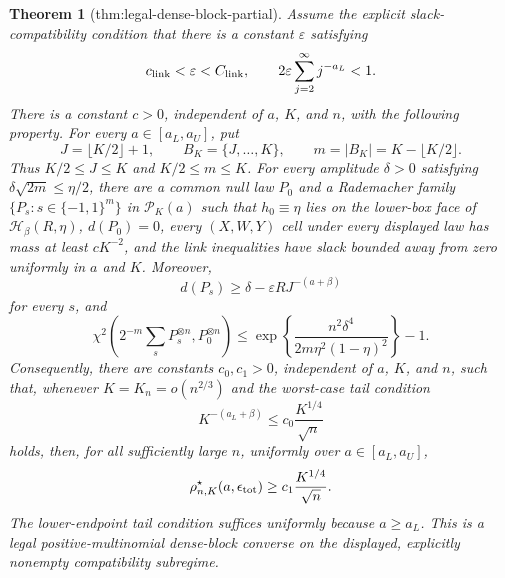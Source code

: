 \documentclass{article}
\newtheorem{theorem}{Theorem}
\begin{document}
\begin{theorem}[thm:legal-dense-block-partial]\label{thm:legal-dense-block-partial}
Assume the explicit slack-compatibility condition that there is a constant \(\varepsilon\) satisfying
\[
 c_{\rm link}<\varepsilon<C_{\rm link},
 \qquad
 2\varepsilon\sum_{j=2}^{\infty}j^{-a_L}<1.
\]
There is a constant \(c>0\), independent of \(a\), \(K\), and \(n\), with the following property.  For every \(a\in[a_L,a_U]\), put
\[
 J=\lfloor K/2\rfloor+1,
 \qquad
 B_K=\{J,\ldots,K\},
 \qquad
 m=|B_K|=K-\lfloor K/2\rfloor.
\]
Thus \(K/2\le J\le K\) and \(K/2\le m\le K\).  For every amplitude \(\delta>0\) satisfying \(\delta\sqrt{2m}\le\eta/2\), there are a common null law \(P_0\) and a Rademacher family \(\{P_s:s\in\{-1,1\}^m\}\) in \(\mathcal P_K(a)\) such that \(h_0\equiv\eta\) lies on the lower-box face of \(\mathcal H_\beta(R,\eta)\), \(d(P_0)=0\), every \((X,W,Y)\) cell under every displayed law has mass at least \(cK^{-2}\), and the link inequalities have slack bounded away from zero uniformly in \(a\) and \(K\).  Moreover,
\[
 d(P_s)\ge \delta-\varepsilon R J^{-(a+\beta)}
\]
for every \(s\), and
\[
 \chi^2\!\left(2^{-m}\sum_sP_s^{\otimes n},P_0^{\otimes n}\right)
 \le \exp\!\left\{\frac{n^2\delta^4}{2m\eta^2(1-\eta)^2}\right\}-1.
\]
Consequently, there are constants \(c_0,c_1>0\), independent of \(a\), \(K\), and \(n\), such that, whenever \(K=K_n=o(n^{2/3})\) and the worst-case tail condition
\[
 K^{-(a_L+\beta)}\le c_0\frac{K^{1/4}}{\sqrt n}
\]
holds, then, for all sufficiently large \(n\), uniformly over \(a\in[a_L,a_U]\),
\[
 \rho^\star_{n,K}(a,\epsilon_{\rm tot})\ge c_1\frac{K^{1/4}}{\sqrt n}.
\]
The lower-endpoint tail condition suffices uniformly because \(a\ge a_L\).  This is a legal positive-multinomial dense-block converse on the displayed, explicitly nonempty compatibility subregime.
\end{theorem}
\end{document}
